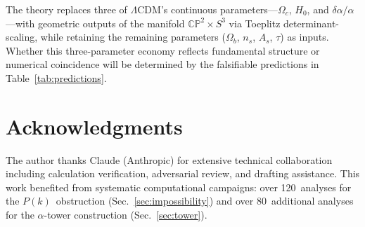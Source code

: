 \documentclass[aps,prd,twocolumn,superscriptaddress,showpacs,floatfix,nofootinbib]{revtex4-2}
\theoremstyle{definition}
\theoremstyle{remark}
\newcommand{\CP}{\mathbb{CP}}
\newcommand{\Sph}{S}
\newcommand{\LCDM}{\Lambda\mathrm{CDM}}
\begin{document}
The theory replaces three of $\LCDM$'s continuous
parameters---$\Omega_c$, $H_0$, and $\delta\alpha/\alpha$---with
geometric outputs of the manifold $\CP^2\times\Sph^3$
via Toeplitz determinant-scaling, while retaining the
remaining parameters ($\Omega_b$, $n_s$, $A_s$, $\tau$)
as inputs. Whether this three-parameter economy reflects
fundamental structure or numerical coincidence will be
determined by the falsifiable predictions in
Table~\ref{tab:predictions}.

\section*{Acknowledgments}

The author thanks Claude (Anthropic) for extensive
technical collaboration including calculation verification,
adversarial review, and drafting assistance. This work
benefited from systematic computational campaigns:
over 120~analyses for the $P(k)$~obstruction
(Sec.~\ref{sec:impossibility}) and over 80~additional
analyses for the $\alpha$-tower construction
(Sec.~\ref{sec:tower}).
\end{document}
